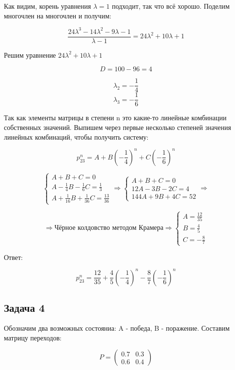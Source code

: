 \documentclass[a4paper,12pt]{article}
\begin{document}
Как видим, корень уравнения $ \lambda = 1 $ подходит, так что всё хорошо. Поделим многочлен на многочлен и получим:


\[ \frac{24 \lambda^3 - 14\lambda^2 - 9\lambda - 1}{\lambda - 1} = 24\lambda^2 + 10\lambda + 1 \]

Решим уравнение $ 24\lambda^2 + 10\lambda + 1 $

\[ D = 100 - 96 = 4 \]

\[ \lambda_{2}  = -\frac{1}{4}\]
\[ \lambda_{3}  = -\frac{1}{6}\]

Так как элементы матрицы в степени n это какие-то линейные комбинации собственных значений. Выпишем через первые несколько степеней значения линейных комбинаций, чтобы получить систему:

\[ p^n_{23} = A + B \left(-\frac{1}{4}\right)^n + C\left(-\frac{1}{6}\right)^n\]

\[ \begin{cases}
A + B + C = 0\\
A - \frac{1}{4}B - \frac{1}{6}C = \frac{1}{3}\\
A + \frac{1}{16}B + \frac{1}{36}C = \frac{13}{36}
\end{cases} \Rightarrow \begin{cases}
A + B + C = 0\\
12A - 3B - 2C = 4\\
144A + 9B + 4C = 52
\end{cases} \Rightarrow  \]

\[ \Rightarrow \text{Чёрное колдовство методом Крамера} \Rightarrow \begin{cases}
A = \frac{12}{35}\\
B = \frac{4}{5}\\
C = -\frac{8}{7}
\end{cases}\]

Ответ:

\[ p^n_{23} = \frac{12}{35} + \frac{4}{5} \left(-\frac{1}{4}\right)^n  -\frac{8}{7} \left(-\frac{1}{6}\right)^n\]


\subsection{Задача 4}

Обозначим два возможных состояниа: A - победа, B - поражение. Составим матрицу переходов:

\[ P = \begin{pmatrix}
0.7 & 0.3 \\
0.6 & 0.4
\end{pmatrix} \]
\end{document}
